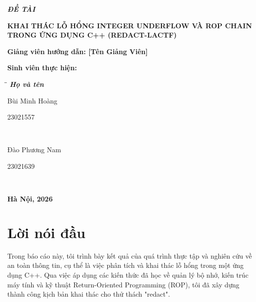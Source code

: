 \documentclass[12pt,a4paper]{report}
\begin{document}
\begin{titlepage}
\begin{flushleft}
    \fontsize{14pt}{17pt}\selectfont  
    \textbf{\textsl{ĐỀ TÀI}}
\end{flushleft}

\begin{center}
    \fontsize{18pt}{17pt}\selectfont 
    \textbf{\textrm{KHAI THÁC LỖ HỔNG INTEGER UNDERFLOW VÀ ROP CHAIN TRONG ỨNG DỤNG C++ (REDACT-LACTF)}}
\end{center}

\vspace{15pt}
\textbf{Giảng viên hướng dẫn: [Tên Giảng Viên]}

\vspace{10pt}
\textbf{Sinh viên thực hiện:}

\begin{tabbing}
\hspace{8cm}\=\hspace{3cm}\=\hspace{3cm} \kill
{\it \textbf{Họ và tên}}\\
\begin{bfseries}Bùi Minh Hoàng\end{bfseries}\> \begin{bfseries}23021557\end{bfseries}\\
\begin{bfseries}Đào Phương Nam\end{bfseries}\> \begin{bfseries}23021639\end{bfseries}\\
\end{tabbing}

\vspace{10pt}
\begin{center}
    \textbf{Hà Nội, 2026}
\end{center}
\end{titlepage}

\chapter*{Lời nói đầu}

Trong báo cáo này, tôi trình bày kết quả của quá trình thực tập và nghiên cứu về an toàn thông tin, cụ thể là việc phân tích và khai thác lỗ hổng trong một ứng dụng C++. Qua việc áp dụng các kiến thức đã học về quản lý bộ nhớ, kiến trúc máy tính và kỹ thuật Return-Oriented Programming (ROP), tôi đã xây dựng thành công kịch bản khai thác cho thử thách "redact".
\end{document}
